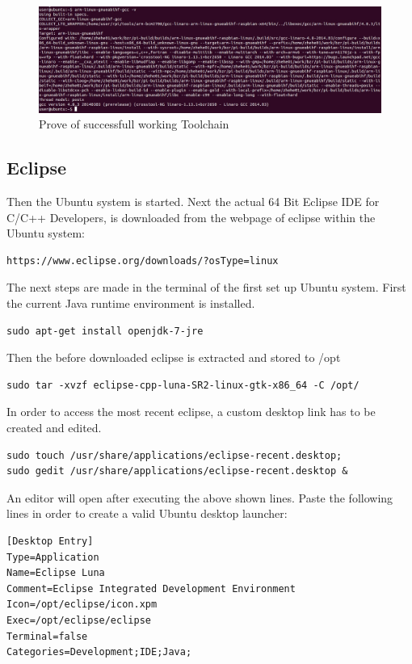 \begin{figure}[H]
	\centering\includegraphics[width=1\textwidth]{fig/Cross_compile_success.jpg}
	\caption{Prove of successfull working Toolchain}
	\label{fig:Cross_compile_success}
\end{figure}

\subsection{Eclipse}
\label{subsec:subsec-Eclipse}


Then the Ubuntu system is started. Next the actual 64 Bit Eclipse IDE for C/C++ Developers, is downloaded from the webpage of eclipse within the Ubuntu system:
\begin{lstlisting}
https://www.eclipse.org/downloads/?osType=linux
\end{lstlisting}

The next steps are made in the terminal of the first set up Ubuntu system. First the current Java runtime environment is installed.
\begin{lstlisting}
sudo apt-get install openjdk-7-jre
\end{lstlisting}
Then the before downloaded eclipse is extracted and stored to /opt
\begin{lstlisting}
sudo tar -xvzf eclipse-cpp-luna-SR2-linux-gtk-x86_64 -C /opt/
\end{lstlisting}
In order to access the most recent eclipse, a custom desktop link has to be created and edited. 
\begin{lstlisting}
sudo touch /usr/share/applications/eclipse-recent.desktop;
sudo gedit /usr/share/applications/eclipse-recent.desktop &
\end{lstlisting}
An editor will open after executing the above shown lines. Paste the following lines in order to create a valid Ubuntu desktop launcher:
\begin{lstlisting}
[Desktop Entry]
Type=Application
Name=Eclipse Luna
Comment=Eclipse Integrated Development Environment
Icon=/opt/eclipse/icon.xpm
Exec=/opt/eclipse/eclipse
Terminal=false
Categories=Development;IDE;Java;
\end{lstlisting}

